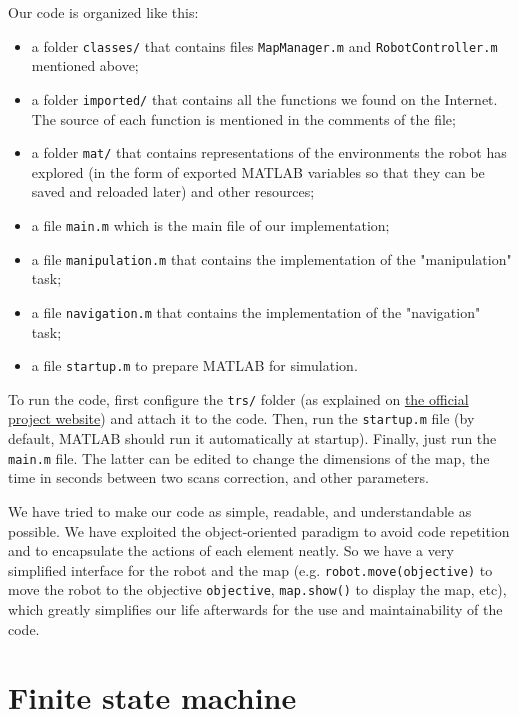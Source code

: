 \documentclass[a4paper, 10pt, conference]{ieeeconf}
\begin{document}
    Our code is organized like this:
    
    \begin{itemize}
        \item a folder \texttt{classes/} that contains files \texttt{MapManager.m} and \texttt{RobotController.m} mentioned above;
        \item a folder \texttt{imported/} that contains all the functions we found on the Internet. The source of each function is mentioned in the comments of the file;
        \item a folder \texttt{mat/} that contains representations of the environments the robot has explored (in the form of exported MATLAB variables so that they can be saved and reloaded later) and other resources;
        \item a file \texttt{main.m} which is the main file of our implementation;
        \item a file \texttt{manipulation.m} that contains the implementation of the "manipulation" task;
        \item a file \texttt{navigation.m} that contains the implementation of the "navigation" task;
        \item a file \texttt{startup.m} to prepare MATLAB for simulation.
    \end{itemize}
    
    To run the code, first configure the \texttt{trs/} folder (as explained on \href{http://ulgrobotics.github.io/trs/setup.html#install}{the official project website}) and attach it to the code. Then, run the \texttt{startup.m} file (by default, MATLAB should run it automatically at startup). Finally, just run the \texttt{main.m} file. The latter can be edited to change the dimensions of the map, the time in seconds between two scans correction, and other parameters.
    
    We have tried to make our code as simple, readable, and understandable as possible. We have exploited the object-oriented paradigm to avoid code repetition and to encapsulate the actions of each element neatly. So we have a very simplified interface for the robot and the map (e.g. \texttt{robot.move(objective)} to move the robot to the objective \texttt{objective}, \texttt{map.show()} to display the map, etc), which greatly simplifies our life afterwards for the use and maintainability of the code.
    
    
    \section{Finite state machine}
    
\end{document}
